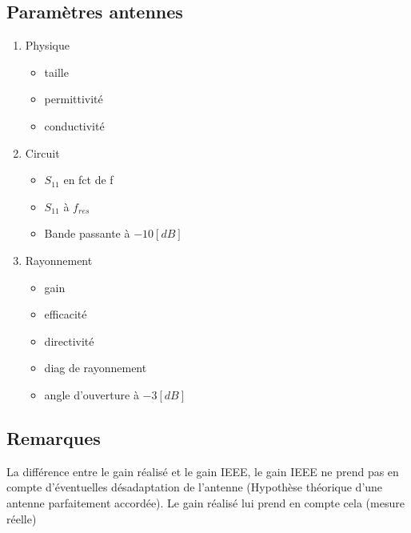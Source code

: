 \documentclass[resume]{subfiles}
\begin{document}
\subsection{Paramètres antennes}
\begin{enumerate}
\item Physique
	\begin{itemize}
	\item taille
	\item permittivité
	\item conductivité
	\end{itemize}
\item Circuit
	\begin{itemize}
	\item $S_{11}$ en fct de f
	\item $S_{11}$ à $f_{res}$
	\item Bande passante à $-10[dB]$
	\end{itemize}
\item Rayonnement
	\begin{itemize}
	\item gain 
	\item efficacité
	\item directivité
	\item diag de rayonnement
	\item angle d'ouverture à $-3[dB]$
	\end{itemize}
\end{enumerate}

\subsection{Remarques}
La différence entre le gain réalisé et le gain IEEE, le gain IEEE ne prend pas en compte d'éventuelles désadaptation de l'antenne (Hypothèse théorique d'une antenne parfaitement accordée). Le gain réalisé lui prend en compte cela (mesure réelle)
\end{document}
